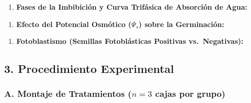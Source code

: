 \documentclass[
  spanish,
  10pt,
  letterpaper,
  twocolumn]{article}
\providecommand{\tightlist}{%
  \setlength{\itemsep}{0pt}\setlength{\parskip}{0pt}}
\begin{document}
\begin{enumerate}
\def\labelenumi{\arabic{enumi}.}
\tightlist
\item
  \textbf{Fases de la Imbibición y Curva Trifásica de Absorción de
  Agua:}
\end{enumerate}

\hrulefill

\hrulefill

\hrulefill

\hrulefill

\hrulefill

\hrulefill

\hrulefill

\hrulefill

\hrulefill

\begin{enumerate}
\def\labelenumi{\arabic{enumi}.}
\setcounter{enumi}{1}
\tightlist
\item
  \textbf{Efecto del Potencial Osmótico (\(\Psi_s\)) sobre la
  Germinación:}
\end{enumerate}

\hrulefill

\hrulefill

\hrulefill

\hrulefill

\hrulefill

\hrulefill

\begin{enumerate}
\def\labelenumi{\arabic{enumi}.}
\setcounter{enumi}{2}
\tightlist
\item
  \textbf{Fotoblastismo (Semillas Fotoblásticas Positivas
  vs.~Negativas):}
\end{enumerate}

\hrulefill

\hrulefill

\hrulefill

\hrulefill

\hrulefill

\hrulefill

\subsection{3. Procedimiento
Experimental}\label{procedimiento-experimental}

\subsubsection{\texorpdfstring{A. Montaje de Tratamientos (\(n=3\) cajas
por
grupo)}{A. Montaje de Tratamientos (n=3 cajas por grupo)}}\label{a.-montaje-de-tratamientos-n3-cajas-por-grupo}
\end{document}
